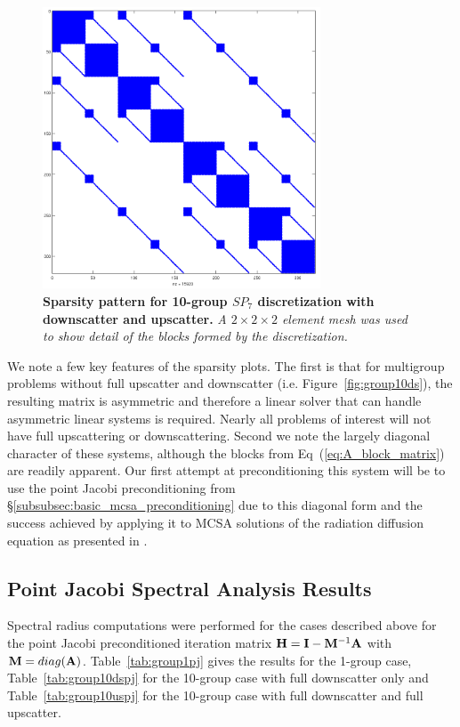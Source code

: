 \begin{figure}[t!]
  \begin{center}
    \includegraphics[width=3.25in]{chapters/spn_equations/group10us.png}
  \end{center}
  \caption{\textbf{Sparsity pattern for 10-group $SP_7$ discretization
      with downscatter and upscatter.} \textit{A $2\times 2 \times 2$ element
      mesh was used to show detail of the blocks formed by the
      discretization.}}
  \label{fig:group10us}
\end{figure}
We note a few key features of the sparsity plots. The first is that
for multigroup problems without full upscatter and downscatter
(i.e. Figure~\ref{fig:group10ds}), the resulting matrix is asymmetric
and therefore a linear solver that can handle asymmetric linear
systems is required. Nearly all problems of interest will not have
full upscattering or downscattering. Second we note the largely
diagonal character of these systems, although the blocks from
Eq~(\ref{eq:A_block_matrix}) are readily apparent. Our first attempt
at preconditioning this system will be to use the point Jacobi
preconditioning from \S\ref{subsubsec:basic_mcsa_preconditioning} due
to this diagonal form and the success achieved by applying it to MCSA
solutions of the radiation diffusion equation as presented in
\cite{evans_monte_2012}.

\subsection{Point Jacobi Spectral Analysis Results}
\label{subsec:spn_analysis_results}
Spectral radius computations were performed for the cases described
above for the point Jacobi preconditioned iteration matrix $\mathbf{H} =
\mathbf{I}-\mathbf{M}^{-1}\mathbf{A}$ with $\mathbf{M} =
diag(\mathbf{A})$. Table~\ref{tab:group1pj} gives the results for the
1-group case, Table~\ref{tab:group10dspj} for the 10-group case with
full downscatter only and Table~\ref{tab:group10uspj} for the 10-group
case with full downscatter and full upscatter.

